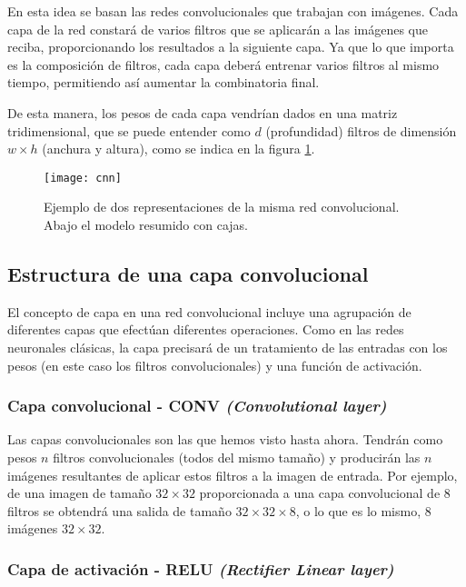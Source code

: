 En esta idea se basan las redes convolucionales que trabajan con imágenes. Cada capa de la red constará de varios filtros que se aplicarán a las imágenes que reciba, proporcionando los resultados a la siguiente capa. Ya que lo que importa es la composición de filtros, cada capa deberá entrenar varios filtros al mismo tiempo, permitiendo así aumentar la combinatoria final.

De esta manera, los pesos de cada capa vendrían dados en una matriz tridimensional, que se puede entender como $d$ (profundidad) filtros de dimensión  $w \times h$ (anchura y altura), como se indica en la figura \ref{cnn_basic}.

\begin{figure}
    \centering
    \caption{Ejemplo de dos representaciones de la misma red convolucional. Abajo el modelo resumido con cajas.}
  \label{cnn_basic}
  \texttt{[image: cnn]}
\end{figure}


\subsection{Estructura de una capa convolucional}

El concepto de capa en una red convolucional incluye una agrupación de diferentes capas que efectúan diferentes operaciones. Como en las redes neuronales clásicas, la capa precisará de un tratamiento de las entradas con los pesos (en este caso los filtros convolucionales) y una función de activación.

\subsubsection{Capa convolucional - CONV \textit{(Convolutional layer)}}

Las capas convolucionales son las que hemos visto hasta ahora. Tendrán como pesos $n$ filtros convolucionales (todos del mismo tamaño) y producirán las $n$ imágenes resultantes de aplicar estos filtros a la imagen de entrada. Por ejemplo, de una imagen de tamaño $32\times 32$ proporcionada a una capa convolucional de 8 filtros se obtendrá una salida de tamaño $32 \times 32 \times 8$, o lo que es lo mismo, 8 imágenes $32 \times 32$.

\subsubsection{Capa de activación - RELU \textit{(Rectifier Linear layer)}}
\label{sec:relu}


